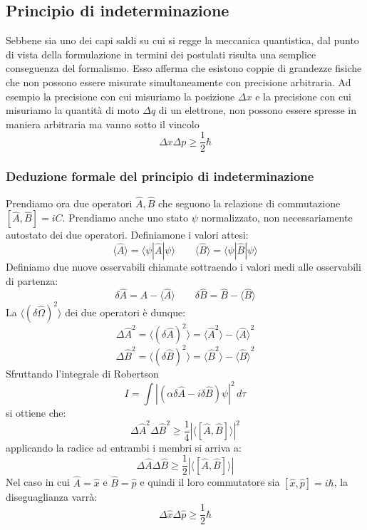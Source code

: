 \subsection{Principio di indeterminazione}
Sebbene sia uno dei capi saldi su cui si regge la meccanica quantistica, dal punto di vista della formulazione in termini dei postulati risulta una semplice conseguenza del formalismo. Esso afferma che esistono coppie di grandezze fisiche che non possono essere misurate simultaneamente con precisione arbitraria. Ad esempio la precisione con cui misuriamo la posizione $\Delta x$ e la precisione con cui misuriamo la quantità di moto $\Delta q$ di un elettrone, non possono essere spresse in maniera arbitraria ma vanno sotto il vincolo
$$ \Delta x \Delta p \ge \frac{1}{2} \hbar$$

\subsubsection{Deduzione formale del principio di indeterminazione}
Prendiamo ora due operatori $\hat{A}, \hat{B}$ che seguono la relazione di commutazione $[\hat{A}, \hat{B}] = iC$. Prendiamo anche uno stato $\psi$ normalizzato, non necessariamente autostato dei due operatori. Definiamone i valori attesi:
$$\langle \hat{A} \rangle = \langle \psi | \hat{A} | \psi \rangle \qquad \langle \hat{B} \rangle = \langle \psi | \hat{B} | \psi \rangle$$
Definiamo due nuove osservabili chiamate \textbf{} sottraendo i valori medi alle osservabili di partenza:
$$\delta \hat{A} = \hat{A} - \langle \hat{A} \rangle \qquad \delta \hat{B} = \hat{B} - \langle \hat{B} \rangle$$
La \textbf{} $\langle (\delta\hat{\Omega})^2 \rangle$ dei due operatori è dunque:
$${\Delta \hat{A}}^2 = \langle (\delta \hat{A})^2 \rangle = \langle \hat{A}^2 \rangle - {\langle \hat{A} \rangle}^2 $$
$${\Delta \hat{B}}^2 = \langle (\delta \hat{B})^2 \rangle = \langle \hat{B}^2 \rangle - {\langle \hat{B} \rangle}^2$$
Sfruttando l'integrale di Robertson
$$ I = \int {|(\alpha \delta \hat{A} - i \delta \hat{B})\psi|}^2 \, d\tau$$
si ottiene che:
$$ {\Delta \hat{A}}^2 {\Delta \hat{B}}^2 \ge \frac{1}{4} {|\langle[\hat{A}, \hat{B}]\rangle|}^2$$
applicando la radice ad entrambi i membri si arriva a:
$$ \Delta \hat{A} \Delta \hat{B} \ge \frac{1}{2} |\langle[\hat{A}, \hat{B}]\rangle|$$
Nel caso in cui $\hat{A} = \hat{x}$ e $\hat{B} = \hat{p}$ e quindi il loro commutatore sia $[\hat{x}, \hat{p}] = i \hbar$, la diseguaglianza varrà:
$$ \Delta \hat{x} \Delta \hat{p} \ge \frac{1}{2} \hbar$$
